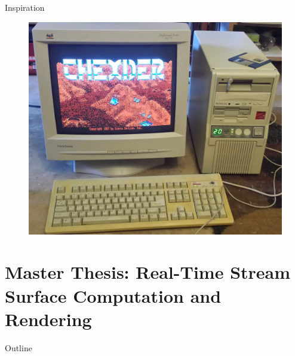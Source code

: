 \documentclass{beamer}
\begin{document}
\begin{frame}{Inspiration}
\begin{itemize}
\begin{figure}
{				\includegraphics[height=0.2\textheight]{figures/PC286.jpg}
			}
       	  \end{figure} 
	\end{itemize}
\end{frame}


\section{Master Thesis: Real-Time Stream Surface Computation and Rendering}

\begin{frame}{Outline}
\end{frame}
\end{document}
